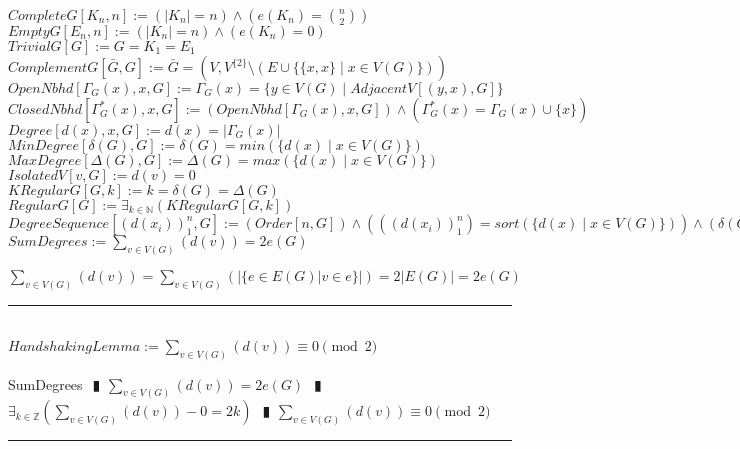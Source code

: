 \documentclass{book}
\newcommand{\abr}{:=}
\newcommand{\pipe}{$\phantom{(}\vrectangleblack\phantom{)}$}
\newcommand{\pr}[1]{\left(#1\right)}
\newcommand{\st}{\mathbin{|}}
\newcommand{\utup}[1]{\{#1\}}
\begin{document}
$CompleteG[K_n, n] \abr (|K_n| = n) \land \pr{e(K_n) = {n \choose 2}}$ \\
$EmptyG[E_n, n] \abr (|K_n| = n) \land \pr{e(K_n) = 0}$ \\
$TrivialG[G] \abr G = K_1 = E_1$ \\
$ComplementG[\bar{G}, G] \abr \bar{G} = \pr{V, V^{\{2\}} \setminus \pr{E \cup \{\utup{x, x} \st x \in V(G)\}}}$ \\
$OpenNbhd[\Gamma_G(x), x, G] \abr \Gamma_G(x) = \{y \in V(G) \st AdjacentV[(y, x), G]\}$ \\
$ClosedNbhd[\Gamma_G^*(x), x, G] \abr \pr{OpenNbhd[\Gamma_G(x), x, G]} \land \pr{\Gamma_G^*(x) = \Gamma_G(x) \cup \{x\}}$ \\
$Degree[d(x), x, G] \abr d(x) = |\Gamma_G(x)|$ \\
$MinDegree[\delta(G), G] \abr \delta(G) = min\pr{\{d(x) \st x \in V(G)\}}$ \\
$MaxDegree[\Delta(G), G] \abr \Delta(G) = max\pr{\{d(x) \st x \in V(G)\}}$ \\
$IsolatedV[v, G] \abr d(v) = 0$ \\
$KRegularG[G, k] \abr k = \delta(G) = \Delta(G)$ \\
$RegularG[G] \abr \exists_{k \in \mathbb{N}}(KRegularG[G, k])$ \\
$DegreeSequence[\pr{d(x_i)}_1^n, G] \abr (Order[n, G]) \land \pr{\pr{\pr{d(x_i)}_1^n} = sort\pr{\{d(x) \st x \in V(G)\}}} \land \pr{\delta(G) = d(x_1) \leq d(x_n) = \Delta(G)}$ \\

$SumDegrees \abr \sum \limits_{v \in V(G)}\pr{d(v)} = 2 e(G)$ \\
\begin{enumerate}
  \lit $\sum \limits_{v \in V(G)}\pr{d(v)} = \sum \limits_{v \in V(G)}\pr{|\{e \in E(G) | v \in e\}|} = 2 |E(G)| = 2 e(G)$ \\
\end{enumerate} \vspace{.75mm} \hrule \vspace{.75mm} \ \\

$HandshakingLemma \abr \sum \limits_{v \in V(G)}\pr{d(v)} \equiv 0 \pmod{2}$ \\
\begin{enumerate}
  \lit SumDegrees \pipe $\sum \limits_{v \in V(G)}\pr{d(v)} = 2 e(G)$ \pipe $\exists_{k \in \mathbb{Z}}\pr{\sum \limits_{v \in V(G)}\pr{d(v)} - 0 = 2 k}$ \pipe $\sum \limits_{v \in V(G)}\pr{d(v)} \equiv 0 \pmod{2}$
\end{enumerate} \vspace{.75mm} \hrule \vspace{.75mm} \ \\
\end{document}
